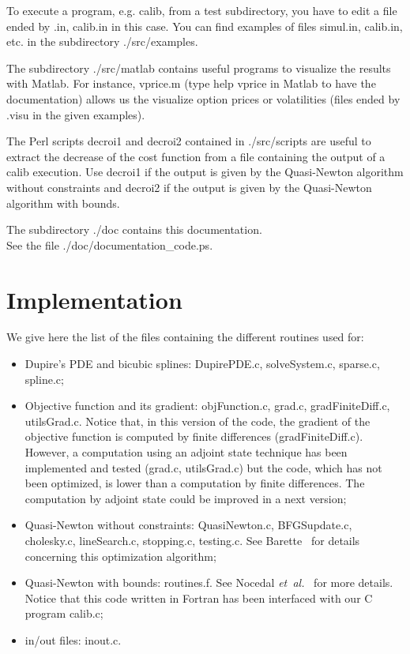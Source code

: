 \documentclass[12pt]{article}
\begin{document}
To execute a program, e.g. calib, from a test subdirectory, 
you have to edit a file ended by .in, calib.in in this case. 
You can find examples of files simul.in, calib.in, etc. 
in the subdirectory ./src/examples.

The subdirectory ./src/matlab contains useful programs 
to visualize the results with Matlab. For instance, 
vprice.m (type help vprice in Matlab to have the documentation) 
allows us the visualize option prices or volatilities 
(files ended by .visu in the given examples).

The Perl scripts decroi1 and decroi2 contained in ./src/scripts 
are useful to extract the decrease of the cost function from 
a file containing the output of a calib execution. Use decroi1 
if the output is given by the Quasi-Newton algorithm without 
constraints and decroi2 if the output is given by the Quasi-Newton 
algorithm with bounds.

The subdirectory ./doc contains this documentation. \\
See the file ./doc/documentation\_code.ps. 

\section{Implementation}

We give here the list of the files containing the different routines
used for:
\begin{itemize}
\item
Dupire's PDE and bicubic splines: DupirePDE.c, solveSystem.c, 
sparse.c, spline.c;
\item
Objective function and its gradient: objFunction.c, grad.c, 
gradFiniteDiff.c, utilsGrad.c. Notice that, in this version of 
the code, the gradient of the objective function is computed by 
finite differences (gradFiniteDiff.c). However, a computation 
using an adjoint state technique has been implemented and tested 
(grad.c, utilsGrad.c) but the code, which has not been 
optimized, is lower than a computation by finite differences. 
The computation by adjoint state could be improved in a 
next version;
\item
Quasi-Newton without constraints: QuasiNewton.c, BFGSupdate.c, 
cholesky.c, lineSearch.c, stopping.c, testing.c. 
See Barette~\cite{bar:optim:02} for details concerning this 
optimization algorithm;
\item
Quasi-Newton with bounds: routines.f. See Nocedal 
{\em et~al.}~\cite{noce:siam:95,noce:acm:97} for more details. 
Notice that this code written in Fortran has been interfaced with 
our C program calib.c;
\item 
in/out files: inout.c. 
\end{itemize}
\end{document}
